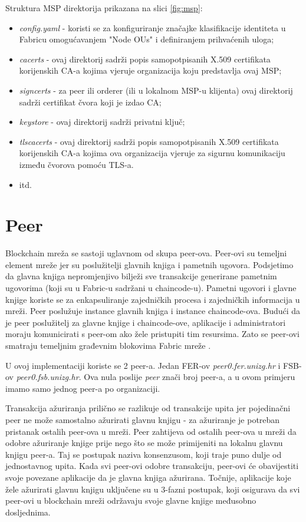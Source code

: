 \documentclass[times, utf8, diplomski]{fer}
\begin{document}
Struktura MSP direktorija prikazana na slici \ref{fig:msp}:

\begin{itemize}
\item \textit{config.yaml} - koristi se za konfiguriranje značajke klasifikacije identiteta u Fabricu omogućavanjem "Node OUs" i definiranjem prihvaćenih uloga;
\item \textit{cacerts} - ovaj direktorij sadrži popis samopotpisanih X.509 certifikata korijenskih CA-a kojima vjeruje organizacija koju predstavlja ovaj MSP;
\item \textit{signcerts} - za peer ili orderer (ili u lokalnom MSP-u klijenta) ovaj direktorij sadrži certifikat čvora koji je izdao CA;
\item \textit{keystore} - ovaj direktorij sadrži privatni ključ;
\item \textit{tlscacerts} - ovaj direktorij sadrži popis samopotpisanih X.509 certifikata korijenskih CA-a kojima ova organizacija vjeruje za sigurnu komunikaciju između čvorova pomoću TLS-a.
\item itd.
\end{itemize}

\section{Peer}
Blockchain mreža se sastoji uglavnom od skupa peer-ova. Peer-ovi su temeljni element mreže jer su poslužitelji glavnih knjiga i pametnih ugovora. Podsjetimo da glavna knjiga nepromjenjivo bilježi sve transakcije generirane pametnim ugovorima (koji su u Fabric-u sadržani u chaincode-u). Pametni ugovori i glavne knjige koriste se za enkapsuliranje zajedničkih procesa i zajedničkih informacija u mreži.
Peer poslužuje instance glavnih knjiga i instance chaincode-ova.
Budući da je peer poslužitelj za glavne knjige i chaincode-ove,  aplikacije i administratori moraju komunicirati s peer-om ako žele pristupiti tim resursima. Zato se peer-ovi smatraju temeljnim građevnim blokovima Fabric mreže \cite{Fabric}. 

U ovoj implementaciji koriste se 2 peer-a. Jedan FER-ov \textit{peer0.fer.unizg.hr }i FSB-ov \textit{peer0.fsb.unizg.hr}. Ova nula poslije \textit{peer} znači broj peer-a, a u ovom primjeru imamo samo jednog peer-a po organizaciji.  

Transakcija ažuriranja prilično se razlikuje od transakcije upita jer pojedinačni peer ne može samostalno ažurirati glavnu knjigu - za ažuriranje je potreban pristanak ostalih peer-ova u mreži. Peer zahtijeva od ostalih peer-ova u mreži da odobre ažuriranje knjige prije nego što se može primijeniti na lokalnu glavnu knjigu peer-a. Taj se postupak naziva konsenzusom,  koji traje puno dulje od jednostavnog upita. Kada svi peer-ovi odobre transakciju,  peer-ovi će obavijestiti svoje povezane aplikacije da je glavna knjiga ažurirana.  Točnije, aplikacije koje žele ažurirati glavnu knjigu uključene su u 3-fazni postupak, koji osigurava da svi peer-ovi u blockchain mreži održavaju svoje glavne knjige međusobno dosljednima.
\end{document}
